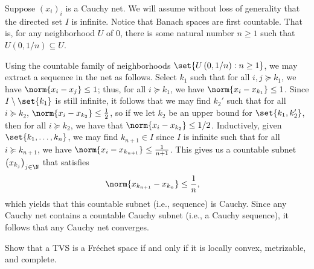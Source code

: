 \documentclass[10pt]{mypackage}
\begin{document}
\begin{solution}
  Suppose $\left( x_i \right)_i$ is a Cauchy net. We will assume without loss of generality that the directed set $I$ is infinite. Notice that Banach spaces are first countable. That is, for any neighborhood $U$ of $0$, there is some natural number $n\geq 1$ such that $U\left( 0,1/n \right)\subseteq U$.

  Using the countable family of neighborhoods $\set{U\left( 0,1/n \right) : n\geq 1}$, we may extract a sequence in the net as follows. Select $k_1$ such that for all $i,j\succeq k_1$, we have $\norm{x_i-x_j}\leq 1$; thus, for all $i\succeq k_1$, we have $\norm{x_i-x_{k_1}}\leq 1$. Since $I\setminus \set{k_1}$ is still infinite, it follows that we may find $k_2'$ such that for all $i\succeq k_2$, $\norm{x_i-x_{k_2}}\leq \frac{1}{2}$, so if we let $k_2$ be an upper bound for $\set{k_1,k_2'}$, then for all $i\succeq k_2$, we have that $\norm{x_i-x_{k_2}}\leq 1/2$. Inductively, given $\set{k_1,\dots,k_n}$, we may find $k_{n+1}\in I$ since $I$ is infinite such that for all $i\succeq k_{n+1}$, we have $\norm{x_i - x_{k_{n+1}}}\leq \frac{1}{n+1}$. This gives us a countable subnet $\left( x_{k_j} \right)_{j\in \N}$ that satisfies
  \begin{align*}
    \norm{x_{k_{n+1}}-x_{k_{n}}} &\leq \frac{1}{n},
  \end{align*}
  which yields that this countable subnet (i.e., sequence) is Cauchy. Since any Cauchy net contains a countable Cauchy subnet (i.e., a Cauchy sequence), it follows that any Cauchy net converges.
\end{solution}
\begin{problem}[Problem II.5]
  Show that a TVS is a Fréchet space if and only if it is locally convex, metrizable, and complete.
\end{problem}
\end{document}
